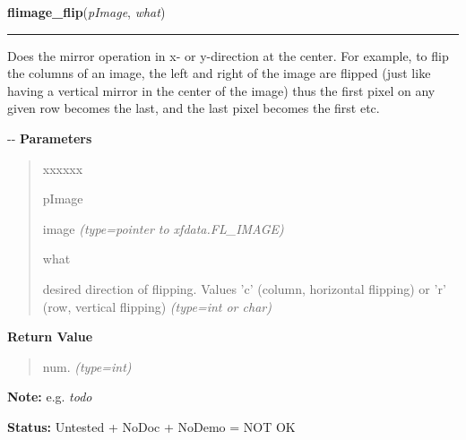     \label{xformslib:flflimage:flimage_flip}

    \vspace{0.5ex}

\hspace{.8\funcindent}\begin{boxedminipage}{\funcwidth}

    \raggedright \textbf{flimage\_flip}(\textit{pImage}, \textit{what})

    \vspace{-1.5ex}

    \rule{\textwidth}{0.5\fboxrule}
\setlength{\parskip}{2ex}

Does the mirror operation in x- or y-direction at the center. For
example, to flip the columns of an image, the left and right of the
image are flipped (just like having a vertical mirror in the center of
the image) thus the first pixel on any given row becomes the last, and
the last pixel becomes the first etc.

-{}-
\setlength{\parskip}{1ex}
      \textbf{Parameters}
      \vspace{-1ex}

      \begin{quote}
        \begin{Ventry}{xxxxxx}

          \item[pImage]


image
            {\it (type=pointer to xfdata.FL\_IMAGE)}

          \item[what]


desired direction of flipping. Values 'c' (column, horizontal flipping)
or 'r' (row, vertical flipping)
            {\it (type=int or char)}

        \end{Ventry}

      \end{quote}

      \textbf{Return Value}
    \vspace{-1ex}

      \begin{quote}

num.
      {\it (type=int)}

      \end{quote}

\textbf{Note:} 
e.g. \emph{todo}


\textbf{Status:} 
Untested + NoDoc + NoDemo = NOT OK


    \end{boxedminipage}

